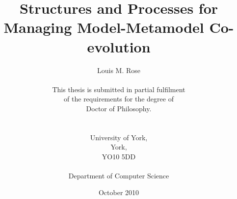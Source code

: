 \title{Structures and Processes for Managing Model-Metamodel Co-evolution}
\author{Louis M. Rose \\ \\
This thesis is submitted in partial fulfilment \\
of the requirements for the degree of \\
Doctor of Philosophy. \\
\\ \\
University of York, \\
York, \\ 
YO10 5DD \\
\\
Department of Computer Science \\ }
\date{October 2010}
